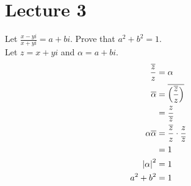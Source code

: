\documentclass[12pt]{article}
\begin{document}
\section{Lecture 3} 

Let $\frac{x-yi}{x+yi} = a + bi$. Prove that $a^2 + b^2 = 1$. \\ Let $z = x + yi$ and $\alpha = a + bi$. $$ \begin{aligned} \frac{\overline{z}}{z} &= \alpha \\ \overline{\alpha} &= \overline{ \Big( \frac{\overline{z}}{z} \Big)} \\ &= \frac{z}{\overline{z}} \\ \alpha\overline{\alpha} &= \frac{\overline{z}}{z} \cdot \frac{z}{\overline{z}} \\ &= 1 \\ \abs{\alpha}^2 &= 1 \\ a^2 + b^2 &= 1 \end{aligned} $$ 
\end{document}
